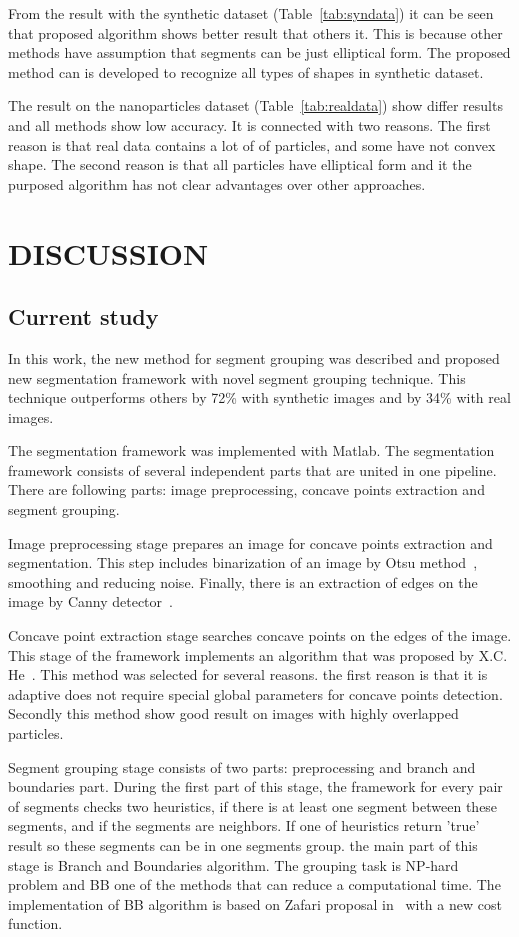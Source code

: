 \documentclass{lutmscthesis}[2010/09/22]
\begin{document}
From the result with the synthetic dataset (Table~\ref{tab:syndata}) it can be seen that
proposed algorithm shows better result that others it. This is because other methods have assumption that segments can be just elliptical form. The proposed method can is developed to recognize all types of shapes in synthetic dataset.


The result on the nanoparticles dataset (Table~\ref{tab:realdata}) show differ results and
all methods show low accuracy. It is connected with two reasons. The first reason is that real data contains a lot of of particles, and some have not convex shape. The second reason is that all particles have elliptical form and it the purposed algorithm has not clear advantages over other approaches. 
\section{DISCUSSION}
\label{sec:discussion}

\subsection{Current study}

In this work, the new method for segment grouping was described and proposed new segmentation framework with novel segment grouping technique.  This technique outperforms others by 72\% with synthetic images and by 34\% with real images.

The segmentation framework was implemented with Matlab. The segmentation framework consists of several independent parts that are united in one pipeline. There are following parts: image preprocessing, concave points extraction and segment grouping. 

Image preprocessing stage prepares an image for concave points extraction and segmentation. This step includes binarization of an image by Otsu method~\cite{otsu}, smoothing and reducing noise. Finally, there is an extraction of edges on the image by Canny detector~\cite{Canny}. 

Concave point extraction stage searches concave points on the edges of the image. This stage of the framework implements an algorithm that was proposed by X.C. He~\cite{CSS}. This method was selected for several reasons. the first reason is that it is adaptive does not require special global parameters for concave points detection. Secondly this method show good result on images with highly overlapped particles.  

Segment grouping stage consists of two parts: preprocessing and branch and boundaries part. During the first part of this stage, the framework for every pair of segments checks two heuristics, if there is at least one segment between these segments, and if the segments are neighbors. If one of heuristics return 'true' result so these segments can be in one segments group. the main part of this stage is Branch and Boundaries algorithm. The grouping task is NP-hard~\cite{zafari-bb} problem and BB one of the methods that can reduce a computational time. The implementation of BB algorithm is based on Zafari proposal in~\cite{zafari-bb} with a new cost function.
\end{document}
